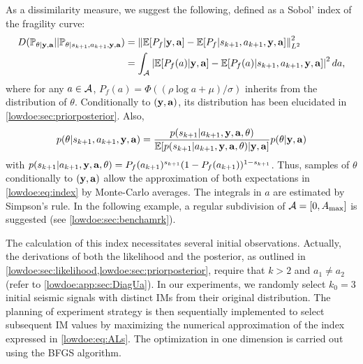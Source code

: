 As a dissimilarity measure, we suggest the following, defined as a  Sobol' index of the fragility curve:
    \begin{align}
    \nonumber
        D(\mathbb{P}_{\theta|\mathbf{y},\mathbf{a}} || \mathbb{P}_{\theta|s_{k+1},a_{k+1},\mathbf{y},\mathbf{a}} ) &= \left\|\mathbb{E}[P_f|\mathbf{y},\mathbf{a}]-\mathbb{E}[P_f|s_{k+1}, a_{k+1}, \mathbf{y},\mathbf{a}]\right\|_{L^2}^2\\
        &= \int_{\mathcal{A}}\left|\mathbb{E}[P_f(a)|\mathbf{y},\mathbf{a}]-\mathbb{E}[P_f(a)|s_{k+1}, a_{k+1}, \mathbf{y},\mathbf{a}]\right|^2d a ,\label{lowdoe:eq:index}
    \end{align}
where for any $a\in\mathcal{A}$, $P_f(a)=\Phi\left((\rho\log a+\mu)/\sigma\right)$ inherits from the distribution of $\theta$. {Conditionally to $(\mathbf{y},\mathbf{a})$, its distribution has been elucidated in \cref{lowdoe:sec:priorposterior}. %
Also, 
\begin{equation}
    p(\theta|s_{k+1}, a_{k+1},\mbf y,\mbf a)  =  \frac{p(s_{k+1}|a_{k+1},\mbf y,\mbf a,\theta)}{\EE[ p(s_{k+1}|a_{k+1},\mbf y,\mbf a,\theta)|\mbf y,\mbf a]}%
        p(\theta|\mbf y,\mbf a)
\end{equation}
with $p(s_{k+1}|a_{k+1},\mathbf{y},\mathbf{a},\theta)=P_f(a_{k+1})^{s_{k+1}}(1-P_f(a_{k+1}))^{1-s_{k+1}}$. Thus, samples of $\theta$ conditionally to $(\mathbf{y},\mathbf{a})$ allow the approximation of both expectations in \cref{lowdoe:eq:index} by Monte-Carlo averages. The integrals in $a$ are estimated by Simpson's rule.
In the following example, a regular subdivision of $\mathcal{A}=[0,A_{\rm max}]$ is suggested (see \cref{lowdoe:sec:benchamrk}).
}


{
The calculation of this index necessitates several initial observations. Actually, the derivations of both the likelihood and the posterior, as outlined in \cref{lowdoe:sec:likelihood,lowdoe:sec:priorposterior}, require that $k > 2$ and $a_1 \ne a_2$ (refer to \cref{lowdoe:app:sec:DiagUa}). In our experiments, we randomly select $k_0 = 3$ initial seismic signals with distinct IMs from their original distribution. The planning of experiment strategy is then sequentially implemented to select subsequent IM values by maximizing the numerical approximation of the index expressed in \cref{lowdoe:eq:ALs}. The optimization in one dimension is carried out using the BFGS algorithm.
}




